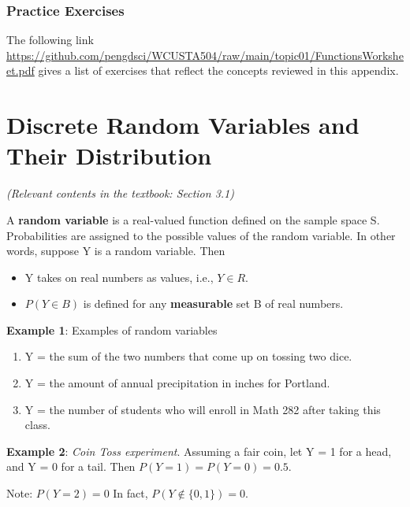 \documentclass[
]{book}
\providecommand{\tightlist}{%
  \setlength{\itemsep}{0pt}\setlength{\parskip}{0pt}}
\begin{document}
\hfill\break

\hypertarget{practice-exercises}{%
\subsection{Practice Exercises}\label{practice-exercises}}

The following link \url{https://github.com/pengdsci/WCUSTA504/raw/main/topic01/FunctionsWorksheet.pdf} gives a list of exercises that reflect the concepts reviewed in this appendix.

\hfill\break

\hypertarget{discrete-random-variables-and-their-distribution}{%
\chapter{Discrete Random Variables and Their Distribution}\label{discrete-random-variables-and-their-distribution}}

\emph{(Relevant contents in the textbook: Section 3.1)}

A \textbf{random variable} is a real-valued function defined on the sample space S. Probabilities are assigned to the possible values of the random variable. In other words, suppose Y is a random variable. Then

\begin{itemize}
\tightlist
\item
  Y takes on real numbers as values, i.e., \(Y\in R\).
\item
  \(P(Y\in B)\) is defined for any \textbf{measurable} set B of real numbers.
\end{itemize}

\textbf{Example 1}: Examples of random variables

\begin{enumerate}
\def\labelenumi{\arabic{enumi}.}
\item
  Y = the sum of the two numbers that come up on tossing two dice.
\item
  Y = the amount of annual precipitation in inches for Portland.
\item
  Y = the number of students who will enroll in Math 282 after taking this class.
\end{enumerate}

\textbf{Example 2}: \emph{Coin Toss experiment}. Assuming a fair coin, let Y = 1 for a head, and Y = 0 for a tail. Then \(P(Y=1) = P(Y=0) = 0.5\).

Note: \(P(Y = 2) = 0\) In fact, \(P(Y \notin \{0, 1 \}) = 0\).
\end{document}
